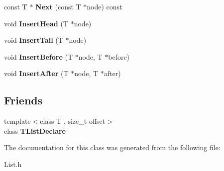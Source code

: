 \begin{DoxyCompactItemize}
\item 
\hypertarget{class_t_list_a7b23c3330ad45d8e9bf853701eb39904}{const T $\ast$ {\bfseries Next} (const T $\ast$node) const }\label{class_t_list_a7b23c3330ad45d8e9bf853701eb39904}

\item 
\hypertarget{class_t_list_aabbc9a08cf4efc5ad4ee0c164cf3cd57}{void {\bfseries Insert\-Head} (T $\ast$node)}\label{class_t_list_aabbc9a08cf4efc5ad4ee0c164cf3cd57}

\item 
\hypertarget{class_t_list_abe2b07c26d4b39c01c46bb4acea28aca}{void {\bfseries Insert\-Tail} (T $\ast$node)}\label{class_t_list_abe2b07c26d4b39c01c46bb4acea28aca}

\item 
\hypertarget{class_t_list_a9c838087f0a605443c47020a9ed35f81}{void {\bfseries Insert\-Before} (T $\ast$node, T $\ast$before)}\label{class_t_list_a9c838087f0a605443c47020a9ed35f81}

\item 
\hypertarget{class_t_list_a817600eff42678aa9f12f5f4760f1c05}{void {\bfseries Insert\-After} (T $\ast$node, T $\ast$after)}\label{class_t_list_a817600eff42678aa9f12f5f4760f1c05}

\end{DoxyCompactItemize}
\subsection*{Friends}
\begin{DoxyCompactItemize}
\item 
\hypertarget{class_t_list_af0be59228d62dee9c5a50dad4d79927a}{{\footnotesize template$<$class T , size\-\_\-t offset$>$ }\\class {\bfseries T\-List\-Declare}}\label{class_t_list_af0be59228d62dee9c5a50dad4d79927a}

\end{DoxyCompactItemize}


The documentation for this class was generated from the following file\-:\begin{DoxyCompactItemize}
\item 
List.\-h\end{DoxyCompactItemize}
